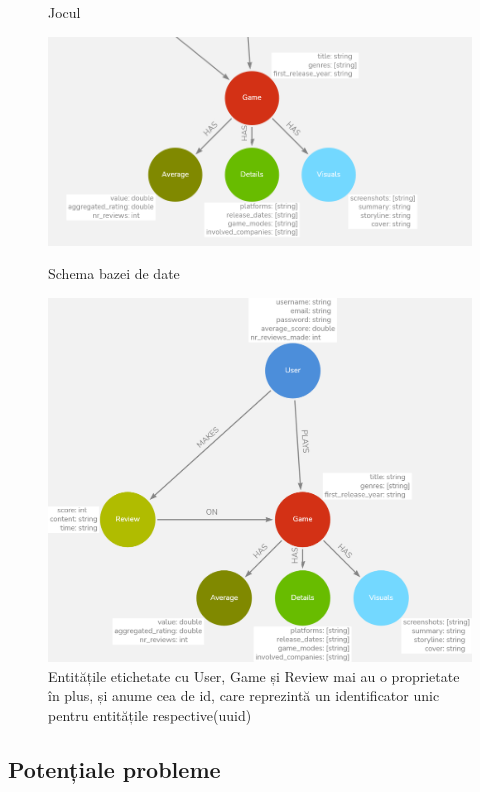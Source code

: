 \documentclass[12pt,a4paper]{report}
\begin{document}
\begin{figure}[H]
\centering
\caption{Jocul}
\includegraphics[scale = 0.6]{exemplu_8_neo4j}
\caption*{}
\end{figure}



\begin{figure}[H]
\centering
\caption{Schema bazei de date}
\includegraphics[scale=0.4]{exemplu_5_neo4j}
\caption*{Entitățile etichetate cu User, Game și Review mai au o proprietate în plus, și anume cea de id, care reprezintă un identificator unic pentru entitățile respective(uuid)}
\end{figure}

\subsection{Potențiale probleme}
\end{document}
